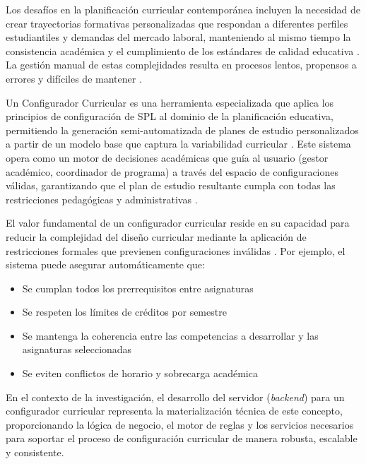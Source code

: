 {{{            Los desafíos en la planificación curricular contemporánea incluyen la necesidad
            de crear trayectorias formativas personalizadas que respondan a diferentes
            perfiles estudiantiles y demandas del mercado laboral, manteniendo al mismo
            tiempo la consistencia académica y el cumplimiento de los estándares de
            calidad educativa \citep{rodriguez2019gestion_curricular}. La gestión manual de estas
            complejidades resulta en procesos lentos, propensos a errores y difíciles de
            mantener \citep{sanchez2020metodologia}.

            Un Configurador Curricular es una herramienta especializada que aplica los
            principios de configuración de \ac{SPL} al dominio de la planificación educativa, permitiendo 
            la generación semi-automatizada de planes de estudio
            personalizados a partir de un modelo base que captura la variabilidad curricular
            \citep{sanchez2020metodologia}. Este sistema opera como un motor de decisiones
            académicas que guía al usuario (gestor académico, coordinador de programa)
            a través del espacio de configuraciones válidas, garantizando que el plan de
            estudio resultante cumpla con todas las restricciones pedagógicas y
            administrativas \citep{chen2020variability}.

            El valor fundamental de un configurador curricular reside en su capacidad para
            reducir la complejidad del diseño curricular mediante la aplicación de
            restricciones formales que previenen configuraciones inválidas \citep{rodriguez2019gestion_curricular}. 
            Por ejemplo, el sistema puede asegurar automáticamente que:
            \begin{itemize}
                \item Se cumplan todos los prerrequisitos entre asignaturas
                \item Se respeten los límites de créditos por semestre
                \item Se mantenga la coherencia entre las competencias a desarrollar y las asignaturas seleccionadas
                \item Se eviten conflictos de horario y sobrecarga académica
            \end{itemize}
            
            En el contexto de la investigación, el desarrollo del servidor (\textit{backend}) para un
            configurador curricular representa la materialización técnica de este concepto,
            proporcionando la lógica de negocio, el motor de reglas y los servicios
            necesarios para soportar el proceso de configuración curricular de manera
            robusta, escalable y consistente.
        }
    }
}
